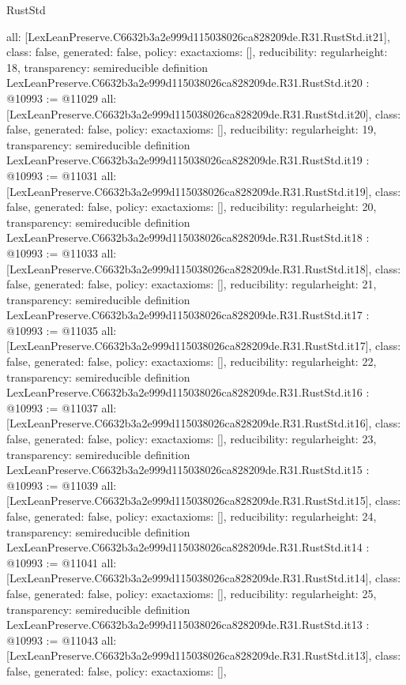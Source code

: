 \begin{lexlean}{RustStd}
\begin{coremodule}
{  all: [LexLeanPreserve.C6632b3a2e999d115038026ca828209de.R31.RustStd.it21],
  class: false,
  generated: false,
  policy: exact{axioms: []},
  reducibility: regular{height: 18},
  transparency: semireducible
}
definition LexLeanPreserve.C6632b3a2e999d115038026ca828209de.R31.RustStd.it20 : @10993 := @11029 {
  all: [LexLeanPreserve.C6632b3a2e999d115038026ca828209de.R31.RustStd.it20],
  class: false,
  generated: false,
  policy: exact{axioms: []},
  reducibility: regular{height: 19},
  transparency: semireducible
}
definition LexLeanPreserve.C6632b3a2e999d115038026ca828209de.R31.RustStd.it19 : @10993 := @11031 {
  all: [LexLeanPreserve.C6632b3a2e999d115038026ca828209de.R31.RustStd.it19],
  class: false,
  generated: false,
  policy: exact{axioms: []},
  reducibility: regular{height: 20},
  transparency: semireducible
}
definition LexLeanPreserve.C6632b3a2e999d115038026ca828209de.R31.RustStd.it18 : @10993 := @11033 {
  all: [LexLeanPreserve.C6632b3a2e999d115038026ca828209de.R31.RustStd.it18],
  class: false,
  generated: false,
  policy: exact{axioms: []},
  reducibility: regular{height: 21},
  transparency: semireducible
}
definition LexLeanPreserve.C6632b3a2e999d115038026ca828209de.R31.RustStd.it17 : @10993 := @11035 {
  all: [LexLeanPreserve.C6632b3a2e999d115038026ca828209de.R31.RustStd.it17],
  class: false,
  generated: false,
  policy: exact{axioms: []},
  reducibility: regular{height: 22},
  transparency: semireducible
}
definition LexLeanPreserve.C6632b3a2e999d115038026ca828209de.R31.RustStd.it16 : @10993 := @11037 {
  all: [LexLeanPreserve.C6632b3a2e999d115038026ca828209de.R31.RustStd.it16],
  class: false,
  generated: false,
  policy: exact{axioms: []},
  reducibility: regular{height: 23},
  transparency: semireducible
}
definition LexLeanPreserve.C6632b3a2e999d115038026ca828209de.R31.RustStd.it15 : @10993 := @11039 {
  all: [LexLeanPreserve.C6632b3a2e999d115038026ca828209de.R31.RustStd.it15],
  class: false,
  generated: false,
  policy: exact{axioms: []},
  reducibility: regular{height: 24},
  transparency: semireducible
}
definition LexLeanPreserve.C6632b3a2e999d115038026ca828209de.R31.RustStd.it14 : @10993 := @11041 {
  all: [LexLeanPreserve.C6632b3a2e999d115038026ca828209de.R31.RustStd.it14],
  class: false,
  generated: false,
  policy: exact{axioms: []},
  reducibility: regular{height: 25},
  transparency: semireducible
}
definition LexLeanPreserve.C6632b3a2e999d115038026ca828209de.R31.RustStd.it13 : @10993 := @11043 {
  all: [LexLeanPreserve.C6632b3a2e999d115038026ca828209de.R31.RustStd.it13],
  class: false,
  generated: false,
  policy: exact{axioms: []},
}
\end{coremodule}
\end{lexlean}
